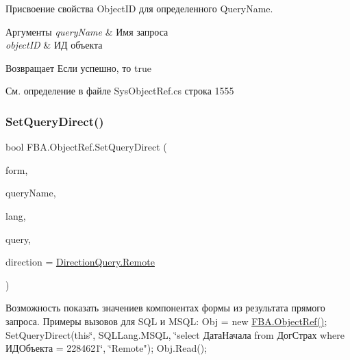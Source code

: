 Присвоение свойства Object\+ID для определенного Query\+Name. 


\begin{DoxyParams}{Аргументы}
{\em query\+Name} & Имя запроса\\
\hline
{\em object\+ID} & ИД объекта\\
\hline
\end{DoxyParams}
\begin{DoxyReturn}{Возвращает}
Если успешно, то true
\end{DoxyReturn}


См. определение в файле Sys\+Object\+Ref.\+cs строка 1555

\mbox{\label{class_f_b_a_1_1_object_ref_a07aab7e5b71aeada14affe1c90a10c79}} 
\subsubsection{\texorpdfstring{Set\+Query\+Direct()}{SetQueryDirect()}}
{\footnotesize\ttfamily bool F\+B\+A.\+Object\+Ref.\+Set\+Query\+Direct (\begin{DoxyParamCaption}\item[{Form}]{form,  }\item[{string}]{query\+Name,  }\item[{\mbox{\hyperlink{namespace_f_b_a_aa7137ed2c5f5027f13bb403ffc2b005e}{S\+Q\+L\+Lang}}}]{lang,  }\item[{string}]{query,  }\item[{\mbox{\hyperlink{namespace_f_b_a_a6ff7d5c242d98046d1980715b06d7300}{Direction\+Query}}}]{direction = {\ttfamily \mbox{\hyperlink{namespace_f_b_a_a6ff7d5c242d98046d1980715b06d7300af8508f576cd3f742dfc268258dcdf0dd}{Direction\+Query.\+Remote}}} }\end{DoxyParamCaption})}



Возможность показать значениев компонентах формы из результата прямого запроса. Примеры вызовов для S\+QL и M\+S\+QL\+: Obj = new \mbox{\hyperlink{class_f_b_a_1_1_object_ref}{F\+B\+A.\+Object\+Ref()}}; ~\newline
Set\+Query\+Direct(this\char`\"{}, S\+Q\+L\+Lang.\+M\+S\+Q\+L, \char`\"{}select ДатаНачала from ДогСтрах where ИДОбъекта = 2284621\char`\"{}, \char`\"{}Remote"); Obj.\+Read(); ~\newline



